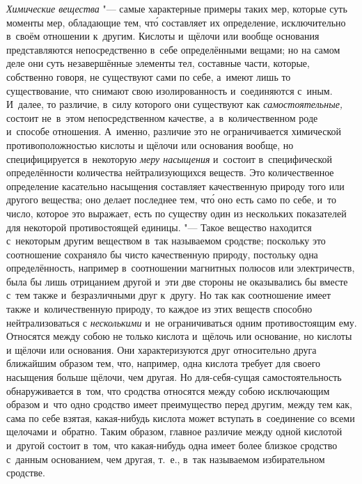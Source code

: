 {\em Химические вещества} "--- самые характерные примеры таких мер, которые
суть моменты мер, обладающие тем, чт\'{о} составляет их определение,
исключительно в~своём отношении к~другим. Кислоты и~щёлочи или
вообще основания представляются непосредственно в~себе определёнными вещами; но
на самом деле они суть незавершённые элементы тел, составные части, которые,
собственно говоря, не существуют сами по себе, а~имеют лишь то существование,
что снимают свою изолированность и~соединяются с~иным. И~далее, то различие,
в~силу которого они существуют как {\em самостоятельные,} состоит не~в~этом
непосредственном качестве, а~в~количественном роде и~способе отношения.
А~именно, различие это не ограничивается химической противоположностью кислоты
и щёлочи или основания вообще, но специфицируется в~некоторую
{\em меру насыщения} и~состоит в~специфической определённости количества
нейтрализующихся веществ. Это количественное определение касательно насыщения
составляет качественную природу того или другого вещества; оно делает последнее
тем, чт\'{о} оно есть само по себе, и~то число, которое это выражает, есть по
существу один из нескольких показателей для некоторой противостоящей единицы.
"--- Такое вещество находится с~некоторым другим веществом в~так называемом
сродстве; поскольку это соотношение сохраняло бы чисто качественную природу,
постольку одна определённость, например в~соотношении магнитных полюсов или
электричеств, была бы лишь отрицанием другой и~эти две стороны не оказывались
бы вместе с~тем также и~безразличными друг к~другу. Но так как соотношение
имеет также и~количественную природу, то каждое из этих веществ способно
нейтрализоваться с {\em несколькими} и~не ограничиваться одним противостоящим
ему. Относятся между собою не только кислота и~щёлочь или основание, но кислоты
и щёлочи или основания. Они характеризуются друг относительно друга ближайшим
образом тем, что, например, одна кислота требует для своего насыщения больше
щёлочи, чем другая. Но для-себя-сущая самостоятельность обнаруживается в~том,
что сродства относятся между собою исключающим образом и~что одно сродство
имеет преимущество перед другим, между тем как, сама по себе взятая,
какая-нибудь кислота может вступать в~соединение со всеми щелочами и~обратно.
Таким образом, главное различие между одной кислотой и~другой состоит в~том,
что какая-нибудь одна имеет более близкое сродство с~данным основанием, чем
другая, т.~е., в~так называемом избирательном сродстве.

